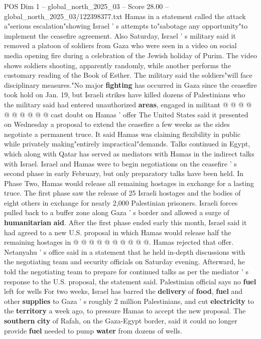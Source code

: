 \begin{textsample}{POS Dim 1 – global\_north\_2025\_03 – Score 28.00 – global\_north\_2025\_03/122398377.txt}
Hamas in a statement called the attack a"serious escalation"showing Israel ' s attempts to"sabotage any opportunity"to implement the ceasefire agreement.
Also Saturday, Israel ' s military said it removed a platoon of soldiers from Gaza who were seen in a video on social media opening fire during a celebration of the Jewish holiday of Purim.
The video shows soldiers shooting, apparently randomly, while another performs the customary reading of the Book of Esther.
The military said the soldiers"will face disciplinary measures."No major \textbf{fighting} has occurred in Gaza since the ceasefire took hold on Jan. 19, but Israeli strikes have killed dozens of Palestinians who the military said had entered unauthorized \textbf{areas}, engaged in militant @ @ @ @ @ @ @ @ @ @ cast doubt on Hamas ' offer The United States said it presented on Wednesday a proposal to extend the ceasefire a few weeks as the sides negotiate a permanent truce.
It said Hamas was claiming flexibility in public while privately making"entirely impractical"demands.
Talks continued in Egypt, which along with Qatar has served as mediators with Hamas in the indirect talks with Israel.
Israel and Hamas were to begin negotiations on the ceasefire ' s second phase in early February, but only preparatory talks have been held.
In Phase Two, Hamas would release all remaining hostages in exchange for a lasting truce.
The first phase saw the release of 25 Israeli hostages and the bodies of eight others in exchange for nearly 2,000 Palestinian prisoners.
Israeli forces pulled back to a buffer zone along Gaza ' s border and allowed a surge of \textbf{humanitarian} \textbf{aid}.
After the first phase ended early this month, Israel said it had agreed to a new U.S. proposal in which Hamas would release half the remaining hostages in @ @ @ @ @ @ @ @ @ @.
Hamas rejected that offer.
Netanyahu ' s office said in a statement that he held in-depth discussions with the negotiating team and security officials on Saturday evening.
Afterward, he told the negotiating team to prepare for continued talks as per the mediator ' s response to the U.S. proposal, the statement said.
Palestinian official says no \textbf{fuel} left for wells For two weeks, Israel has barred the \textbf{delivery} of \textbf{food}, \textbf{fuel} and other \textbf{supplies} to Gaza ' s roughly 2 million Palestinians, and cut \textbf{electricity} to the \textbf{territory} a week ago, to pressure Hamas to accept the new proposal.
The \textbf{southern} \textbf{city} of Rafah, on the Gaza-Egypt border, said it could no longer provide \textbf{fuel} needed to pump \textbf{water} from dozens of wells.

\end{textsample}
